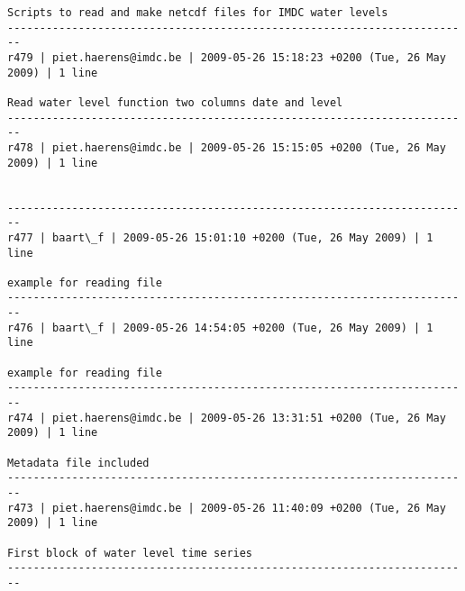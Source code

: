 \documentclass[9]{report}
\begin{document}
\begin{description}
\begin{verbatim}
Scripts to read and make netcdf files for IMDC water levels
------------------------------------------------------------------------
r479 | piet.haerens@imdc.be | 2009-05-26 15:18:23 +0200 (Tue, 26 May 2009) | 1 line

Read water level function two columns date and level
------------------------------------------------------------------------
r478 | piet.haerens@imdc.be | 2009-05-26 15:15:05 +0200 (Tue, 26 May 2009) | 1 line


------------------------------------------------------------------------
r477 | baart\_f | 2009-05-26 15:01:10 +0200 (Tue, 26 May 2009) | 1 line

example for reading file
------------------------------------------------------------------------
r476 | baart\_f | 2009-05-26 14:54:05 +0200 (Tue, 26 May 2009) | 1 line

example for reading file
------------------------------------------------------------------------
r474 | piet.haerens@imdc.be | 2009-05-26 13:31:51 +0200 (Tue, 26 May 2009) | 1 line

Metadata file included
------------------------------------------------------------------------
r473 | piet.haerens@imdc.be | 2009-05-26 11:40:09 +0200 (Tue, 26 May 2009) | 1 line

First block of water level time series
------------------------------------------------------------------------


\end{verbatim}
\end{description}
\end{document}
